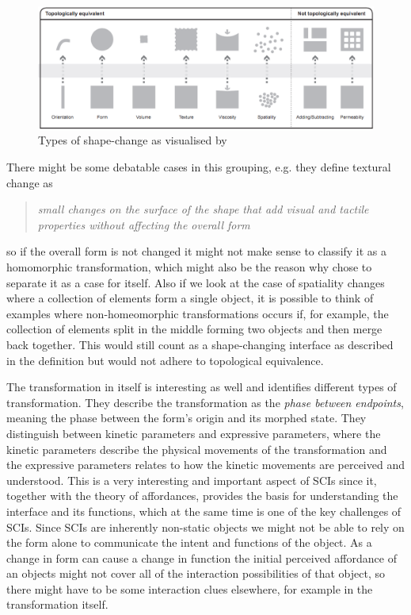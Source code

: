 \begin{figure}[h]
  \centering
  \includegraphics[width=0.9\linewidth]{figures/types-of-change}
	\caption{Types of shape-change as visualised by \citep{rasmussen2012shape}}
   \label{types-of-change}
\end{figure}

There might be some debatable cases in this grouping, e.g. they define textural change as
\begin{quotation}
  \emph{small changes on the surface of the shape that add visual and tactile properties without affecting the overall form}
\end{quotation} 
so if the overall form is not changed it might not make sense to classify it as a homomorphic transformation, which might also be the reason why \citeauthor{coelho2011shape} chose to separate it as a case for itself.
Also if we look at the case of spatiality changes where a collection of elements form a single object, it is possible to think of examples where non-homeomorphic transformations occurs if, for example, the collection of elements split in the middle forming two objects and then merge back together.
This would still count as a shape-changing interface as described in the definition but would not adhere to topological equivalence.   

The transformation in itself is interesting as well and \citeauthor{rasmussen2012shape} identifies different types of transformation.
They describe the transformation as the \textit{phase between endpoints}, meaning the phase between the form's origin and its morphed state.
They distinguish between kinetic parameters and expressive parameters, where the kinetic parameters describe the physical movements of the transformation and the expressive parameters relates to how the kinetic movements are perceived and understood.
This is a very interesting and important aspect of SCIs since it, together with the theory of affordances, provides the basis for understanding the interface and its functions, which at the same time is one of the key challenges of SCIs.
Since SCIs are inherently non-static objects we might not be able to rely on the form alone to communicate the intent and functions of the object. As a change in form can cause a change in function the initial perceived affordance of an objects might not cover all of the interaction possibilities of that object, so there might have to be some interaction clues elsewhere, for example in the transformation itself.

